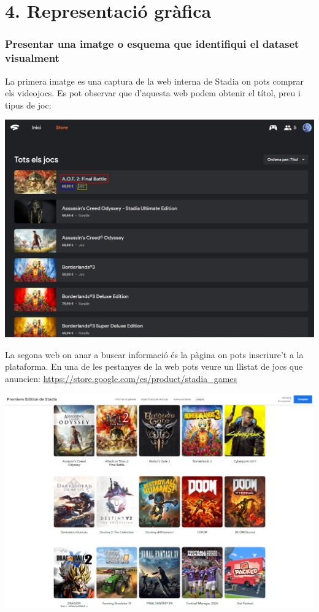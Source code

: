 \documentclass[]{article}
\begin{document}
\hypertarget{representaciuxf3-gruxe0fica}{%
\section{4. Representació gràfica}\label{representaciuxf3-gruxe0fica}}

\hypertarget{presentar-una-imatge-o-esquema-que-identifiqui-el-dataset-visualment}{%
\subsubsection{Presentar una imatge o esquema que identifiqui el dataset
visualment}\label{presentar-una-imatge-o-esquema-que-identifiqui-el-dataset-visualment}}

La primera imatge es una captura de la web interna de Stadia on pots
comprar els videojocs. Es pot observar que d'aquesta web podem obtenir
el títol, preu i tipus de joc:

\includegraphics{stadia_store_list.png}

La segona web on anar a buscar informació és la pàgina on pots
inscriure't a la plataforma. En una de les pestanyes de la web pots
veure un llistat de jocs que anuncien:
\url{https://store.google.com/es/product/stadia_games}

\includegraphics{store_google_stadia_games.png}
\end{document}
